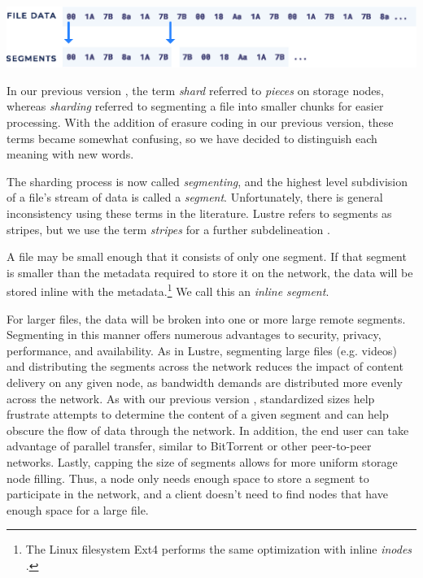 \documentclass[8pt,fleqn,openany]{book}
\begin{document}
\begin{center}
\includegraphics[width=.9\textwidth]{images/stream-segment.eps}
\end{center}

In our previous version \cite{storj-v2}, the term {\em shard} referred to
{\em pieces} on storage nodes, whereas {\em sharding} referred to segmenting a file
into smaller chunks for easier processing. With the addition of erasure coding
in our previous version, these terms became somewhat confusing, so we have
decided to distinguish each meaning with new words.

The sharding process is now called {\em segmenting}, and the highest level
subdivision of a file's stream of data is called a {\em segment}.
Unfortunately, there is general inconsistency using these terms in the
literature. Lustre refers to segments as stripes, but we use the term
{\em stripes} for a further subdelineation \cite{lustre}.

A file may be small enough that it consists of only one segment.
If that segment is smaller than the metadata required to store it on the
network, the data will be stored inline with the metadata.\footnote{
The Linux filesystem Ext4 performs the same optimization
with inline {\em inodes} \cite{ext4-inline}.}
We call this an {\em inline segment}.

For larger files, the data will be broken
into one or more large remote segments. Segmenting in this manner offers
numerous advantages to security, privacy, performance, and availability.
As in Lustre, segmenting large files (e.g. videos) and distributing the segments
across the network reduces the impact of content delivery on any
given node, as
bandwidth demands are distributed more evenly across the network.
As with our previous version \cite{storj-v2},
standardized sizes help frustrate attempts to determine the content of a given
segment and can help obscure the flow of data through the network.
In addition, the end user can take advantage of parallel transfer, similar to
BitTorrent \cite{bittorrent} or other peer-to-peer networks.
Lastly, capping the size of segments
allows for more uniform storage node filling. Thus, a node only needs enough
space to store a segment to participate in the network,
and a client doesn't need
to find nodes that have enough space for a large file.
\end{document}
